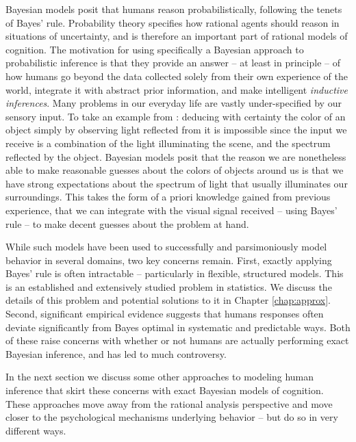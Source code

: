 Bayesian models posit that humans reason probabilistically, following the tenets of Bayes' rule. Probability theory specifies how rational agents should reason in situations of uncertainty\cite{hacking2006emergence, gigerenzer1990empire}, and is therefore an important part of rational models of cognition. The motivation for using specifically a Bayesian approach to probabilistic inference is that they provide an answer -- at least in principle -- of how humans go beyond the data collected solely from their own experience of the world, integrate it with abstract prior information, and make intelligent \textit{inductive inferences}. Many problems in our everyday life are vastly under-specified by our sensory input. To take an example from \citet{griffiths2008bayesian}: deducing with certainty the color of an object simply by observing light reflected from it is impossible since the input we receive is a combination of the light illuminating the scene, and the spectrum reflected by the object. Bayesian models posit that the reason we are nonetheless able to make reasonable guesses about the colors of objects around us is that we have strong expectations about the spectrum of light that usually illuminates our surroundings. This takes the form of a priori knowledge gained from previous experience, that we can integrate with the visual signal received -- using Bayes' rule -- to make decent guesses about the problem at hand.

While such models have been used to successfully and parsimoniously model behavior in several domains, two key concerns remain. First, exactly applying Bayes' rule is often intractable -- particularly in flexible, structured models. This is an established and extensively studied problem in statistics. We discuss the details of this problem and potential solutions to it in Chapter \ref{chap:approx}. Second, significant empirical evidence suggests that humans responses often deviate significantly from Bayes optimal in systematic and predictable ways. \citep{tversky1974judgment, slovic1971comparison, grether1980bayes, fischhoff1983hypothesis} Both of these raise concerns with whether or not humans are actually performing exact Bayesian inference, and has led to much controversy. \citep{mellers2001frequency, gigerenzer1996narrow, samuels2012ending} 

In the next section we discuss some other approaches to modeling human inference that skirt these concerns with exact Bayesian models of cognition. These approaches move away from the rational analysis perspective and move closer to the psychological mechanisms underlying behavior -- but do so in very different ways.

